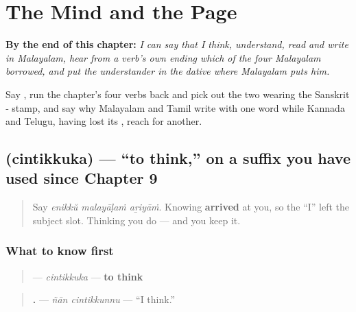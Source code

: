 
\chapter{The Mind and the Page}
\label{ch:ml-mind-and-page}

\begin{chapteropening}
\textbf{By the end of this chapter:} \emph{I can say that I think, understand, read and write in Malayalam, hear from a verb's own ending which of the four Malayalam borrowed, and put the understander in the dative where Malayalam puts him.}

Say   , run the chapter's four verbs back and pick out the two wearing the Sanskrit ‑ stamp, and say why Malayalam and Tamil write with one word while Kannada and Telugu, having lost its , reach for another.
\end{chapteropening}

\section[\texorpdfstring{\ml{ചിന്തിക്കുക} (cintikkuka)}{ചിന്തിക്കുക (cintikkuka)}]{ (cintikkuka) — \textquotedblleft{}to think,\textquotedblright{} on a suffix you have used since Chapter 9}

\label{lesson:ML-C33-cintikkuka}



\begin{quote}
Say \emph{enikkŭ malayāḷaṁ aṟiyāṁ}. Knowing \textbf{arrived} at you, so the \textquotedblleft{}I\textquotedblright{} left the subject slot. Thinking you do — and you keep it.
\end{quote}

\subsection*{What to know first}
\begin{quote}
\textbf{} — \emph{cintikkuka} — \textbf{to think}
\end{quote}

\begin{quote}
\textbf{ .} — \emph{ñān cintikkunnu} — \textquotedblleft{}I think.\textquotedblright{}
\end{quote}

